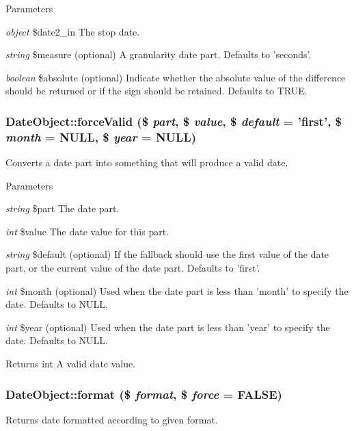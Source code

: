 \begin{DoxyParams}{Parameters}
\item[{\em object}]\$date2\_\-in The stop date. \item[{\em string}]\$measure (optional) A granularity date part. Defaults to 'seconds'. \item[{\em boolean}]\$absolute (optional) Indicate whether the absolute value of the difference should be returned or if the sign should be retained. Defaults to TRUE. \end{DoxyParams}
\hypertarget{classDateObject_a6dfed6663a0da8662e3cbfa1886d8396}{
\subsubsection[{forceValid}]{\setlength{\rightskip}{0pt plus 5cm}DateObject::forceValid (\$ {\em part}, \/  \$ {\em value}, \/  \$ {\em default} = {\ttfamily 'first'}, \/  \$ {\em month} = {\ttfamily NULL}, \/  \$ {\em year} = {\ttfamily NULL})}}
\label{classDateObject_a6dfed6663a0da8662e3cbfa1886d8396}
Converts a date part into something that will produce a valid date.


\begin{DoxyParams}{Parameters}
\item[{\em string}]\$part The date part. \item[{\em int}]\$value The date value for this part. \item[{\em string}]\$default (optional) If the fallback should use the first value of the date part, or the current value of the date part. Defaults to 'first'. \item[{\em int}]\$month (optional) Used when the date part is less than 'month' to specify the date. Defaults to NULL. \item[{\em int}]\$year (optional) Used when the date part is less than 'year' to specify the date. Defaults to NULL.\end{DoxyParams}
\begin{DoxyReturn}{Returns}
int A valid date value. 
\end{DoxyReturn}
\hypertarget{classDateObject_ad85e273d0e5ddb394f3e3f0fcd68a19b}{
\subsubsection[{format}]{\setlength{\rightskip}{0pt plus 5cm}DateObject::format (\$ {\em format}, \/  \$ {\em force} = {\ttfamily FALSE})}}
\label{classDateObject_ad85e273d0e5ddb394f3e3f0fcd68a19b}
Returns date formatted according to given format.

